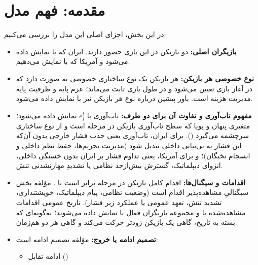 \documentclass[12pt]{article}
\begin{document}
\section{مقدمه: فهم مدل}
در این بخش، اجزای اصلی این مدل را بررسی می‌کنیم:

\begin{itemize}
    \item {
        \textbf{بازیگران اصلی:}
        دو بازیکن در این بازی حضور دارند. ایران که با 
        نمایش داده می‌شود و آمریکا که با
        نمایش می‌دهیم.
    }
    \item {
        \textbf{نوع خصوصی هر بازیکن:}
        هر بازیکن  یک نوع ساختاری خصوصی به صورت
        دارد که در آغاز بازی تعیین می‌شود و در طول بازی ثابت می‌ماند؛
        عزم پایه و
        ظرفیت پایه مدیریت هزینه است. باور پیشین درباره نوع هر بازیکن نیز با
        نمایش داده می‌شود.
    }
    \item {
        \textbf{مفهوم تاب‌آوری و تفاوت آن برای دو طرف:}
        تاب‌آوری با
        $e_i^t$
        نمایش داده می‌شود؛ متغیری پنهان و پویا که سطح تاب‌آوری بازیکن در مرحله
        است و از نوع ساختاری سرچشمه می‌گیرد
        ().
        برای ایران، تاب‌آوری یعنی جذب فشار خارجی بدون آن‌که این فشار به بی‌ثباتی داخلی تبدیل شود
        (مدیریت تحریم‌ها، حفظ نظم داخلی و انسجام نخبگان)؛
        و برای آمریکا، یعنی تداوم فشار بر ایران بدون خستگی داخلی، انزوای دیپلماتیک،
        گسترش بیش‌ازحد نظامی یا تشدیدِ مهارنشدنی تنش.
    }
    \item {
        \textbf{اقدامات و سیگنال‌ها:}
        اقدام کامل بازیکن  در مرحله  برابر است با
        .
        مؤلفه
        بخش سیگنالیِ مشاهده‌پذیر اقدام است
        (وضعیت نظامی، پیام دیپلماتیک، خویشتنداری، تشدید تنش، تعهد عمومی یا عملکرد زیر فشار).
        تاریخ عمومی اقدامات مشاهده‌شده با
        و مجموعه بازیگران فعال با
        نمایش داده می‌شوند؛ به‌گونه‌ای که بسته به تاریخ، گاهی یک بازیکن زودتر حرکت می‌کند و گاهی هر دو هم‌زمان.
    }
    \item {
        \textbf{تصمیم ادامه یا خروج:}
        مؤلفه
        تصمیم ادامه است:
        \begin{itemize}
            \item 
            ادامه تقابل 
            ()


\end{itemize}}
\end{itemize}
\end{document}
